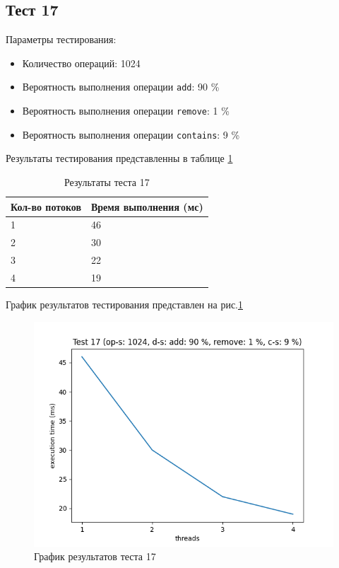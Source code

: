 \subsection*{Тест 17}

Параметры тестирования:

\begin{itemize}
    \item Количество операций: 1024
    \item Вероятность выполнения операции \verb|add|: 90 \%
    \item Вероятность выполнения операции \verb|remove|: 1 \%
    \item Вероятность выполнения операции \verb|contains|: 9 \%
\end{itemize}

Результаты тестирования представленны в таблице \ref{tab:results17}


\begin{table}[H]
    \centering
    \begin{tabular}{|l|l|}
        \hline
        Кол-во потоков & Время выполнения (мс) \\
        \hline
        1 & 46 \\
        \hline
        2 & 30 \\
        \hline
        3 & 22 \\
        \hline
        4 & 19 \\
        \hline
    \end{tabular}
    \caption{Результаты теста 17}
    \label{tab:results17}
\end{table}
        

График результатов тестирования представлен на рис.\ref{fig:plot17}

\begin{figure}[H]
    \centering
    \includegraphics[width=0.7\linewidth]{photo/plot17}
    \caption{График результатов теста 17}
    \label{fig:plot17}
\end{figure}

